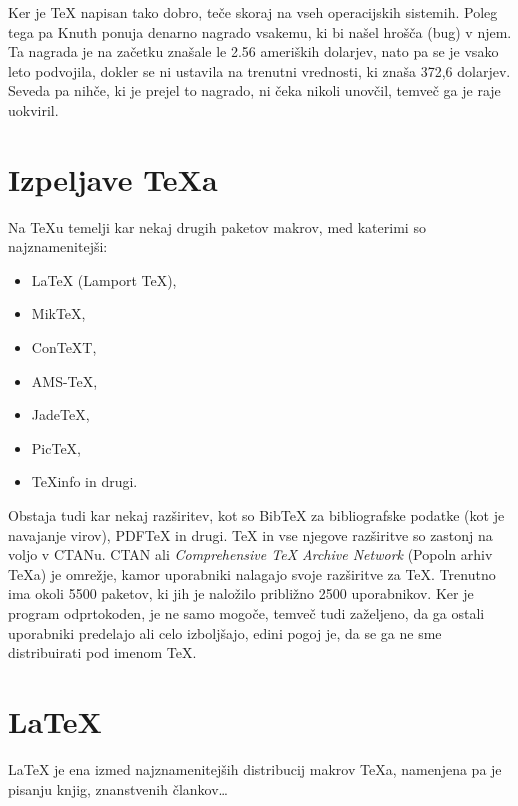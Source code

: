 \documentclass[a4paper]{book}
\begin{document}
Ker je \TeX{} napisan tako dobro, teče skoraj na vseh operacijskih sistemih. Poleg tega pa Knuth ponuja denarno nagrado vsakemu, ki bi našel hrošča (bug) v njem. Ta nagrada je na začetku znašale le 2.56 ameriških dolarjev, nato pa se je vsako leto podvojila, dokler se ni ustavila na trenutni vrednosti, ki znaša 372,6 dolarjev. Seveda pa nihče, ki je prejel to nagrado, ni čeka nikoli unovčil, temveč ga je raje uokviril.


\chapter{Izpeljave \TeX{}a}
Na \TeX{}u temelji kar nekaj drugih paketov makrov, med katerimi so najznamenitejši:
\begin{itemize}
\item \LaTeX{} (Lamport \TeX{}),
\item Mik\TeX{},
\item Con\TeX{}T,
\item AMS-\TeX{},
\item Jade\TeX{},
\item Pic\TeX{},
\item \TeX{}info in drugi.
\end{itemize}

Obstaja tudi kar nekaj razširitev, kot so Bib\TeX{} za bibliografske podatke (kot je navajanje virov), PDF\TeX{} in drugi.
\TeX{} in vse njegove razširitve so zastonj na voljo v CTANu. CTAN ali \textit{Comprehensive \TeX{} Archive Network} (Popoln arhiv \TeX{}a) je omrežje, kamor uporabniki nalagajo svoje razširitve za \TeX{}. Trenutno ima okoli 5500 paketov, ki jih je naložilo približno 2500 uporabnikov.
Ker je program odprtokoden, je ne samo mogoče, temveč tudi zaželjeno, da ga ostali uporabniki predelajo ali celo izboljšajo, edini pogoj je, da se ga ne sme distribuirati pod imenom \TeX{}.


\chapter{\LaTeX{}}
\LaTeX{} je ena izmed najznamenitejših distribucij makrov \TeX{}a, namenjena pa je pisanju knjig, znanstvenih člankov\ldots

\end{document}
